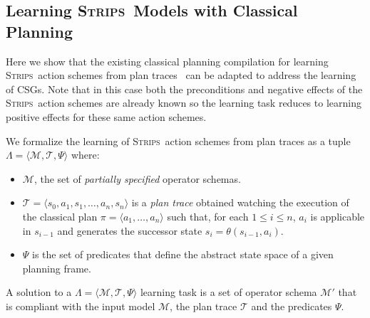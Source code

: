\documentclass[letterpaper]{article} %
\newcommand{\tup}[1]{{\langle #1 \rangle}}
\newcommand{\strips}{\textsc{Strips}}     %
\begin{document}
\subsection{Learning \strips\ Models with Classical Planning}
Here we show that the existing classical planning compilation for learning \strips\ action schemes from plan traces~\cite{aineto:learningSTRIPS:ICAPS2018} can be adapted to address the learning of CSGs. Note that in this case both the preconditions and negative effects of the \strips\ action schemes are already known so the learning task reduces to learning positive effects for these same action schemes.

We formalize the learning of \strips\ action schemes from plan traces as a tuple $\Lambda=\tup{\mathcal{M},\mathcal{T},\Psi}$ where:
\begin{itemize}
\item $\mathcal{M}$, the set of {\em partially specified} operator schemas.
\item $\mathcal{T}=\tup{s_0,a_1,s_1,\ldots,a_n,s_{n}}$ is a {\em plan trace} obtained watching the execution of the classical plan $\pi=\tup{a_1, \ldots, a_n}$ such that, for each {\small $1\leq i\leq n$}, $a_i$ is applicable in $s_{i-1}$ and generates the successor state $s_i=\theta(s_{i-1},a_i)$. 
\item $\Psi$ is the set of predicates that define the abstract state space of a given planning frame. 
\end{itemize}

A solution to a $\Lambda=\tup{\mathcal{M},\mathcal{T},\Psi}$ learning task is a set of operator schema $\mathcal{M}'$ that is compliant with the input model $\mathcal{M}$, the plan trace $\mathcal{T}$ and the predicates $\Psi$. 
\end{document}
